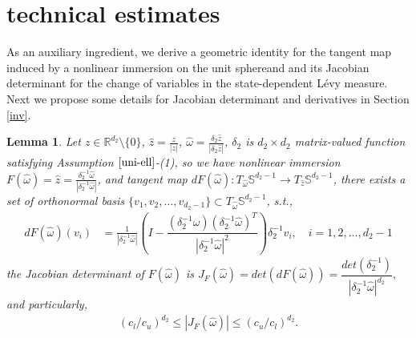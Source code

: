 \documentclass[11pt,reqno]{amsart}
\newtheorem{lemma}{\indent Lemma}[section]
\numberwithin{equation}{section}
\newcommand{\s}{\mathbb{S}}
\newcommand{\om}{\omega}
\newcommand{\de}{\delta}
\newcommand{\mb}{\mathbb}
\begin{document}
\appendix
\section{technical estimates}\label{A}
As an auxiliary ingredient, we derive a geometric identity for the tangent map induced by a nonlinear immersion on the unit sphereand and its Jacobian determinant for the change of variables in the state-dependent Lévy measure. 
Next we propose some details for Jacobian determinant and derivatives in Section \ref{inv}.
\begin{lemma}\label{jac}
Let $z\in\mb{R}^{d_{2}}\setminus \{0\}$, $\hat{z}=\frac{z}{|z|}$, $\hat{\om}=\frac{\de_2 \hat{z}}{|\de_2\hat{z}|}$, $\de_2$ is $d_{2}\times d_{2}$ matrix-valued function satisfying Assumption $\ref{uni-ell}$-(1),  so we have nonlinear immersion $F(\hat{\om})=\hat{z}=\frac{\de^{-1}_2 \hat{\om}}{|\de^{-1}_2 \hat{\om}|}$, and tangent map $dF(\hat{\om}):T_{\hat{\om}}\s^{d_2-1}\rightarrow T_{\hat{z}}\s^{d_2-1}$, there exists a set of orthonormal basis $\{v_{1},v_{2},\dots,v_{d_2-1}\}\subset T_{\hat{\om}}\s^{d_2-1}$, s.t.,
\begin{align*}
dF(\hat{\om})(v_i)
&=\frac{1}{|\de^{-1}_2\hat{\om}|}\left(I-\dfrac{(\de^{-1}_2\hat{\om})(\de^{-1}_2\hat{\om})^T}{|\de^{-1}_2\hat{\om}|^{2}} \right)\de^{-1}_2v_i, \quad i=1,2,\dots,d_2-1
\end{align*}
the Jacobian determinant of $F(\hat{\om})$ is $J_{F}(\hat{\om})=det(dF({\hat{\om}}))=\dfrac{det(\de_2^{-1})}{|\de_2^{-1}\hat{\om}|^{d_{2}}},$ and particularly,
\begin{align*}
	\left(c_l/c_u\right)^{d_2}	\leq |J_F(\hat{\om})|\leq \left(c_u/c_l \right)^{d_2}.
\end{align*}
\end{lemma}
\end{document}
